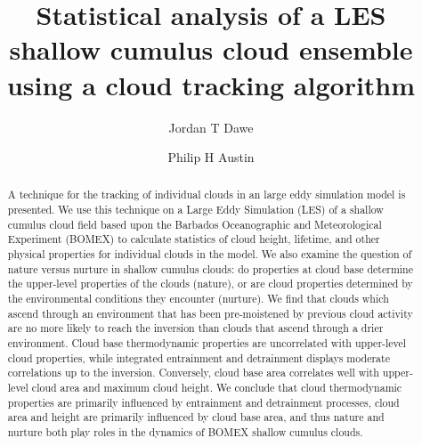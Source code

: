 \documentclass[acp]{copernicus}
\begin{document}
\title{Statistical analysis of a LES shallow cumulus cloud ensemble using a 
cloud tracking algorithm}


\author[1]{Jordan T Dawe}
\author[1]{Philip H Austin}










\received{}
\pubdiscuss{} %
\revised{}
\accepted{}
\published{}




\maketitle



\begin{abstract}
A technique for the tracking of individual clouds in an large eddy simulation 
model is presented.  We use this technique on a Large Eddy Simulation (LES) of 
a shallow cumulus cloud field based upon the Barbados Oceanographic and 
Meteorological Experiment (BOMEX) to calculate statistics of cloud height, 
lifetime, and other physical properties for individual clouds in the model.  We 
also examine the question of nature versus nurture in shallow cumulus clouds: 
do properties at cloud base determine the upper-level properties of the clouds 
(nature), or are cloud properties determined by the environmental conditions 
they encounter (nurture).  We find that clouds which ascend through an 
environment that has been pre-moistened by previous cloud activity are no more 
likely to reach the inversion than clouds that ascend through a drier 
environment.  Cloud base thermodynamic properties are uncorrelated with 
upper-level cloud properties, while integrated entrainment and detrainment
displays moderate correlations up to the inversion.  Conversely, cloud base area 
correlates well with upper-level cloud area and maximum cloud height.  We 
conclude that cloud thermodynamic properties are primarily influenced by 
entrainment and detrainment processes, cloud area and height are primarily 
influenced by cloud base area, and thus nature and nurture both play roles in 
the dynamics of BOMEX shallow cumulus clouds.
\end{abstract}
\end{document}
